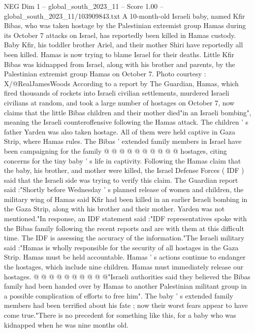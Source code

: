 \begin{textsample}{NEG Dim 1 – global\_south\_2023\_11 – Score 1.00 – global\_south\_2023\_11/103909843.txt}  \label{ex:f1_neg_227}
A 10-month-old Israeli baby, named Kfir Bibas, who was taken hostage by the Palestinian extremist group Hamas during its October 7 attacks on Israel, has reportedly been killed in Hamas custody.
Baby Kfir, his toddler brother Ariel, and their mother Shiri have reportedly all been killed.
Hamas is now trying to blame Israel for their deaths.
Little Kfir Bibas was kidnapped from Israel, along with his brother and parents, by the Palestinian extremist group Hamas on October 7.
Photo courtesy : X/@RealJamesWoods According to a report by The Guardian, Hamas, which fired thousands of rockets into Israeli civilian settlements, murdered Israeli civilians at random, and took a large number of hostages on October 7, now claims that the little Bibas children and their mother died"in an Israeli bombing", meaning the Israeli counteroffensive following the Hamas attack.
The children ' s father Yarden was also taken hostage.
All of them were held captive in Gaza Strip, where Hamas rules.
The Bibas ' extended family members in Israel have been campaigning for the family @ @ @ @ @ @ @ @ @ @ hostages, citing concerns for the tiny baby ' s life in captivity.
Following the Hamas claim that the baby, his brother, and mother were killed, the Israel Defense Forces ( IDF ) said that the Israeli side was trying to verify this claim.
The Guardian report said :"Shortly before Wednesday ' s planned release of women and children, the military wing of Hamas said Kfir had been killed in an earlier Israeli bombing in the Gaza Strip, along with his brother and their mother.
Yarden was not mentioned."In response, an IDF statement said :"IDF representatives spoke with the Bibas family following the recent reports and are with them at this difficult time.
The IDF is assessing the accuracy of the information."The Israeli military said :"Hamas is wholly responsible for the security of all hostages in the Gaza Strip.
Hamas must be held accountable.
Hamas ' s actions continue to endanger the hostages, which include nine children.
Hamas must immediately release our hostages. @ @ @ @ @ @ @ @ @ @"Israeli authorities said they believed the Bibas family had been handed over by Hamas to another Palestinian militant group in a possible complication of efforts to free him".
The baby ' s extended family members had been terrified about his fate ; now their worst fears appear to have come true."There is no precedent for something like this, for a baby who was kidnapped when he was nine months old.

\end{textsample}
